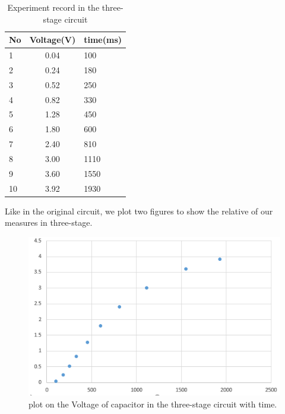 \begin{table}[htbp]\centering
	\caption{Experiment record in the three-stage circuit}
	\renewcommand\arraystretch{1.5}
	\begin{tabular}{lcl}
		\toprule
		No		&Voltage(V)	&time(ms)	\\
		\midrule
		1		&0.04		&100		\\
		
		2		&0.24		&180		\\
		
		3		&0.52		&250		\\
		
		4		&0.82		&330		\\
		
		5		&1.28		&450		\\
		
		6		&1.80		&600		\\
		
		7		&2.40		&810		\\
		
		8		&3.00		&1110		\\
		
		9		&3.60		&1550		\\
		
		10		&3.92		&1930		\\
		\bottomrule
	\end{tabular}
\end{table}
\phantom{ } Like in the original circuit, we plot two figures to show the relative of our measures in three-stage.
\begin{figure}[htbp]
	\centering %
	\includegraphics[width=\linewidth]{images/2_7.PNG} %
	\caption{plot on the Voltage of capacitor in the three-stage circuit with time.} %
	\label{fig:2.7} %
\end{figure}
